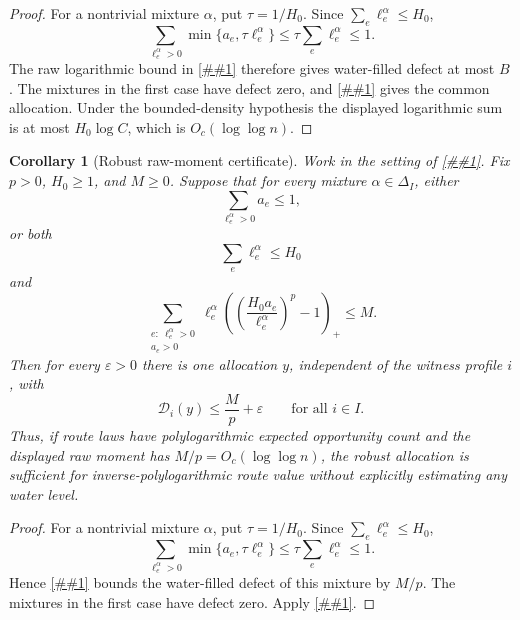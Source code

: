 \documentclass[10pt]{article}
\newcommand{\cref}[1]{\ref{##1}}
\newtheorem{corollary}[theorem]{Corollary}
\theoremstyle{definition}
\begin{document}
\begin{proof}
   For a nontrivial mixture \(\alpha\), put \(\tau=1/H_0\). Since
   \(\sum_e\ell^\alpha_e\le H_0\),
   \[
      \sum_{\ell^\alpha_e>0}\min\{a_e,\tau\ell^\alpha_e\}
      \le
      \tau\sum_e\ell^\alpha_e
      \le1.
   \]
   The raw logarithmic bound in
   \cref{lem:waterfilled-raw-moment-certificate} therefore gives water-filled
   defect at most \(B\).  The mixtures in the first case have defect zero, and
   \cref{lem:robust-waterfilled-minimax} gives the common allocation.  Under
   the bounded-density hypothesis the displayed logarithmic sum is at most
   \(H_0\log C\), which is \(O_c(\log\log n)\).
\end{proof}

\begin{corollary}[Robust raw-moment certificate]
   \label{cor:robust-waterfilled-raw-moment}
   Work in the setting of \cref{lem:robust-waterfilled-minimax}.  Fix
   \(p>0\), \(H_0\ge1\), and \(M\ge0\).  Suppose that for every mixture
   \(\alpha\in\Delta_I\), either
   \[
      \sum_{\ell^\alpha_e>0}a_e\le1,
   \]
   or both
   \[
      \sum_e\ell^\alpha_e\le H_0
   \]
   and
   \[
      \sum_{\substack{e:\ \ell^\alpha_e>0\\ a_e>0}}
      \ell^\alpha_e
      \left(
      \left(\frac{H_0a_e}{\ell^\alpha_e}\right)^p-1
      \right)_+
      \le M .
   \]
   Then for every \(\varepsilon>0\) there is one allocation \(y\), independent
   of the witness profile \(i\), with
   \[
      \mathcal D_i(y)\le \frac Mp+\varepsilon
      \qquad\text{for all }i\in I.
   \]
   Thus, if route laws have polylogarithmic expected opportunity count and the
   displayed raw moment has \(M/p=O_c(\log\log n)\), the robust allocation is
   sufficient for inverse-polylogarithmic route value without explicitly
   estimating any water level.
\end{corollary}

\begin{proof}
   For a nontrivial mixture \(\alpha\), put
   \(\tau=1/H_0\).  Since \(\sum_e\ell^\alpha_e\le H_0\),
   \[
      \sum_{\ell^\alpha_e>0}\min\{a_e,\tau\ell^\alpha_e\}
      \le
      \tau\sum_e\ell^\alpha_e
      \le1.
   \]
   Hence \cref{lem:waterfilled-raw-moment-certificate} bounds the water-filled
   defect of this mixture by \(M/p\).  The mixtures in the first case have
   defect zero.  Apply \cref{lem:robust-waterfilled-minimax}.
\end{proof}
\end{document}
